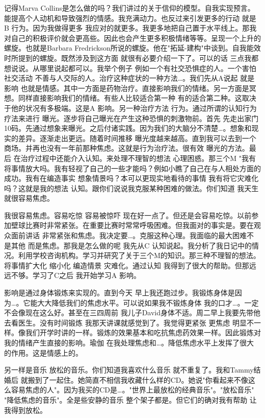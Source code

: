 记得Marva Collins是怎么做的吗？我们讲过的关于信仰的模型。自我实现预言。能提高个人动机和导致强烈的情感。我充满动力。也反过来引发更多的行动 就是B 行为。因为我做得更多 我应对的就更多。我更多地把自己置于水平线上。那我对自己的积极评价就会更高些。因此也会产生更多积极情绪等等。呈现一个上升的螺旋。也就是Barbara Fredrickson所说的螺旋。他在"拓延-建构"中谈到。自我能效时所提到的螺旋。既然涉及到这方面 就很有必要介绍一下了。可以的话 三点我都想说说。从哪里说起都可以。我举个例子 例如一个有社交恐惧症的人。一个害怕社交活动 不善与人交际的人。治疗这种症状的一种方法…。我们先从A说起 就是影响 也就是情感。其中一方面是药物治疗。直接影响我们的情绪。另一方面是冥想。同样直接影响我们的情绪。有些人比较适合第一种 有的适合第二种。这取决于他的状况有多极端。这是A 影响。另一种治疗方法 行为。通过所谓的认知行为疗法来进行 曝光。逐步将自己曝光在产生这种恐惧的刺激物前。首先 先走出家门10码。先通过想象来曝光。之后付诸实践。因为我们的大脑分不清楚…。想象和现实的差异。逐渐走出更远。随着时间推移 曝光度越来越高。直到我可以去到一个商场。并再也没有一年前那种焦虑。这就是行为治疗法。很有效 曝光的方法。最后 在治疗过程中还能介入认知。来处理不理智的想法 心理困惑。那三个M "我有将事情放大吗。我有轻视了自己的一些才能吗？例如小瞧了自己在与人相处方面的成功。我有在编造事实 想象情景吗？本可以更现实地看待的事情 我有将它灾难化吗？这就是我的想法 认知。跟你们说说我克服某种困难的做法。你们知道 我天生就很容易焦虑。 

我很容易焦虑。容易吃惊 容易被惊吓 现在好一点了。但还是会容易吃惊。以前参加壁球比赛时非常紧张。在重要比赛时常常呼吸困难。但我面对的事实是。要在观众面前讲话 非常紧张和焦虑。我决定要…。克服这种心理。我面临的最大困难不是其他 而是焦虑。那我是怎么做的呢 我先从C 认知说起。我分析了我日记中的情况。利用学校咨询机构。学习并研究了关于三个M的知识。那三种不理智的想法。将事情扩大化 缩小化 编造情景 灾难化。通过认知 我得到了很大的帮助。但那远远不够。学习了C之后 我开始学习A 影响。 

影响是通过身体锻炼来实现的。直到今天 早上我还跑过步。我锻炼身体是因为…。它能大大降低我们的焦虑水平。可以说如果我不锻炼身体 我的口才…。一定不会像现在这么好。甚至在三四周前 我儿子David身体不适。周二早上我要先带他去看医生。没有时间锻炼 我那天讲课就感觉到了。我觉得更紧张 更焦虑 明显不一样。像我们开学时讲的一样。锻炼的效果基本和吃抗焦虑药效果一样。因此锻炼对我的情绪产生直接的影响。瑜伽 在我处理焦虑和…。降低焦虑水平上发挥了很大的作用。这是情感上的。 

另一样是音乐 放松的音乐。你们知道我喜欢什么音乐 就不重复了。我和Tammy结婚后 就搬到了一起住。她简直不相信我收藏什么样的CD。她说"你看起来不像这么容易焦虑的人"。因为我买的CD是…。"世界上最放松的经典音乐"。"放松音乐" "降低焦虑的音乐"。全是些安静的音乐 整个架子都是。但它们的确对我有帮助 让我得到放松。 

